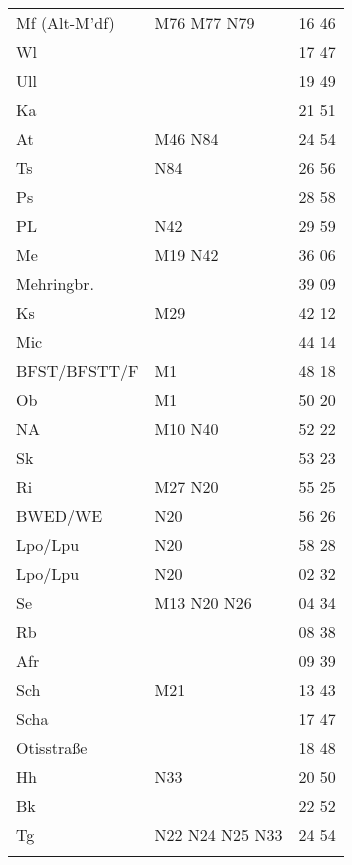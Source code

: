 %
\begin{tabular}{!{\color{schiefergrau}\vrule width 3pt}*{3}{l!{\color{schiefergrau}\vrule width 3pt}}}
\hline
{}
 \\
\hline
Mf (Alt-M'df)& \mbus{} M76 M77 \nbus{} N79         & 16 46 \\
Wl           &                                     & 17 47 \\
Ull          &                                     & 19 49 \\
Ka           &                                     & 21 51 \\
At           & \mbus{} M46 \nbus{} N84             & 24 54 \\
Ts           & \nbus{} N84                         & 26 56 \\
Ps           &                                     & 28 58 \\
PL           & \nbus{} N42                         & 29 59 \\
Me           & \nusieben{} \mbus{} M19 \nbus{} N42 & 36 06 \\
Mehringbr.   & \nueins{}                           & 39 09 \\
Ks           & \mbus{} M29                         & 42 12 \\
Mic          & \nuzwei{}                           & 44 14 \\
BFST/BFSTT/F & \mtram{} M1                         & 48 18 \\
Ob           & \mtram{} M1                         & 50 20 \\
NA           & \mtram{} M10 \nbus{} N40            & 52 22 \\
Sk           &                                     & 53 23 \\
Ri           & \mbus{} M27 \nbus{} N20             & 55 25 \\
BWED/WE      & \nbus{} N20                         & 56 26 \\
Lpo/Lpu      & \nuneun{} \nbus{} N20               & 58 28 \\
\hline
Lpo/Lpu      & \nuneun{} \nbus{} N20               & 02 32 \\
Se           & \mtram{} M13 \nbus{} N20 N26        & 04 34 \\
Rb           &                                     & 08 38 \\
Afr          &                                     & 09 39 \\
Sch          & \mbus{} M21                         & 13 43 \\
Scha         &                                     & 17 47 \\
Otisstraße   &                                     & 18 48 \\
Hh           & \nbus{} N33                         & 20 50 \\
Bk           &                                     & 22 52 \\
Tg           & \nbus{} N22 N24 N25 N33             & 24 54 \\
\myhline
\end{tabular}
